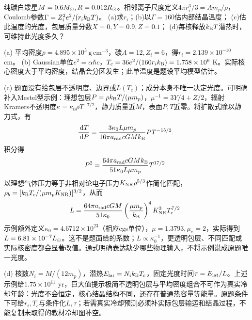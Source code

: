 \begin{exercise}
纯碳白矮星$M=0.6M_{\odot},R=0.012R_{\odot}$。相邻离子尺度定义$4\pi r_i^3/3=Am_p/\rho$，Coulomb参数$\Gamma=Z_i^2e^2/(r_ik_{\mathrm B} T)$。
(a)求$r_i$；(b)以$\Gamma=160$估内部结晶温度；
(c)估此温度的光度，包层质量分数$X=0,Y=0.9,Z=0.1$；
(d)每核释放$k_{\mathrm B} T$潜热时，可维持此光度多久？
\end{exercise}
\begin{solution}
(a) 平均密度$\bar\rho=4.895\times10^5\ \mathrm{g\,cm^{-3}}$，碳$A=12,Z_i=6$，得$r_i=2.139\times10^{-10}$ cm。
(b) Gaussian单位$e^2=\alpha\hbar c$，$T_c=36e^2/(160r_ik_{\mathrm B})=1.758\times10^6$ K。实际核心密度大于平均密度，结晶会分区发生；此单温度是题设平均模型估计。

(c) 题面没有给包层不透明度、边界或$L(T_c)$；成分本身不唯一决定光度。可明确补入Mestel型示例：理想包层$P=\rho k_{\mathrm B} T/(\mu m_p)$，$\mu^{-1}=3Y/4+Z/2$，辐射Kramers不透明度$\kappa=\kappa_0\rho T^{-7/2}$，静力质量近$M$，表面$P,T$近零。将扩散式除以静力式，有
\[
 \frac{\,\mathrm d T}{\,\mathrm d P}=\frac{3\kappa_0L\mu m_p}{16\pi a_{\rm rad}cGMk_{\mathrm B}}
 P T^{-15/2}.
\]
积分得
\[
 P^2=\frac{64\pi a_{\rm rad}cGMk_{\mathrm B}}{51\kappa_0L\mu m_p}T^{17/2}.
\]
以理想气体压力等于非相对论电子压力$K_{\rm NR}\rho^{5/3}$作简化匹配，$\rho_b=[k_{\mathrm B} T_c/(\mu m_pK_{\rm NR})]^{3/2}$，从而
\[
 L=\frac{64\pi a_{\rm rad}cGM}{51\kappa_0}
 \left(\frac{\mu m_p}{k_{\mathrm B}}\right)^4K_{\rm NR}^3T_c^{7/2}.
\]
示例额外定义$\kappa_0=4.6712\times10^{23}$（相应cgs单位），$\mu=1.3793,\mu_e=2$，实际得到$L=6.81\times10^{-7}L_{\odot}$。这不是题面给的系数；$L\propto\kappa_0^{-1}$，更透明包层、不同匹配或实际核密度都会显著改值。通式明确表达缺少哪些物理输入，不将示例说成原题唯一光度。

(d) 核数$N_i=M/(12m_p)$，潜热$E_{\rm lat}=N_ik_{\mathrm B} T_c$，固定光度时间$\tau=E_{\rm lat}/L$。上述示例给$1.75\times10^{11}$ yr，巨大值提示极简不透明包层与平均密度组合不可作为真实冷却年龄：光度不会恒定，核心结晶结构不同，还存在普通热容量等能量。原题条件下可给$r_i,T_c$与条件化$L,\tau$；若需真实冷却预测必须补实际包层输运和结晶过程，不能复制未取得的教材冷却图补空。
\end{solution}

